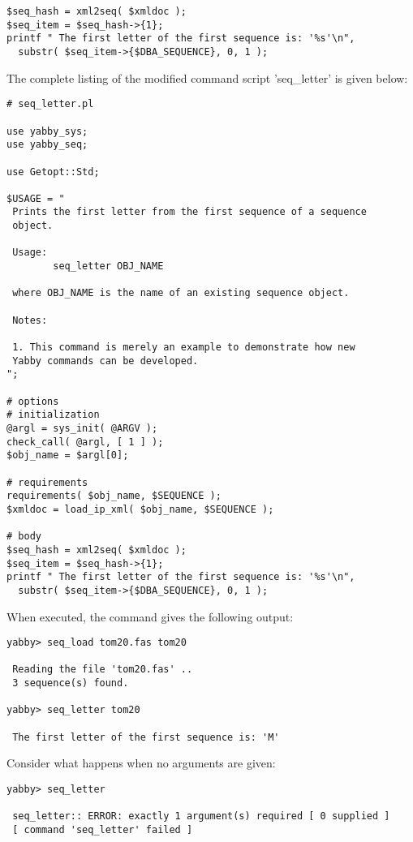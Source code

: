 \begin{verbatim}
$seq_hash = xml2seq( $xmldoc );
$seq_item = $seq_hash->{1};
printf " The first letter of the first sequence is: '%s'\n",
  substr( $seq_item->{$DBA_SEQUENCE}, 0, 1 );
\end{verbatim}

The complete listing of the modified command script 'seq\_letter'
is given below: 

\begin{verbatim}
# seq_letter.pl

use yabby_sys;
use yabby_seq;

use Getopt::Std;

$USAGE = "
 Prints the first letter from the first sequence of a sequence
 object. 

 Usage:
        seq_letter OBJ_NAME

 where OBJ_NAME is the name of an existing sequence object.

 Notes:

 1. This command is merely an example to demonstrate how new
 Yabby commands can be developed.
";

# options
# initialization
@argl = sys_init( @ARGV );
check_call( @argl, [ 1 ] );
$obj_name = $argl[0];

# requirements
requirements( $obj_name, $SEQUENCE );
$xmldoc = load_ip_xml( $obj_name, $SEQUENCE );

# body
$seq_hash = xml2seq( $xmldoc );
$seq_item = $seq_hash->{1};
printf " The first letter of the first sequence is: '%s'\n",
  substr( $seq_item->{$DBA_SEQUENCE}, 0, 1 );
\end{verbatim}

When executed, the command gives the following output:

\begin{verbatim}
yabby> seq_load tom20.fas tom20

 Reading the file 'tom20.fas' ..
 3 sequence(s) found.

yabby> seq_letter tom20

 The first letter of the first sequence is: 'M'
\end{verbatim}

Consider what happens when no arguments are given:

\begin{verbatim}
yabby> seq_letter 

 seq_letter:: ERROR: exactly 1 argument(s) required [ 0 supplied ]
 [ command 'seq_letter' failed ]
\end{verbatim}

